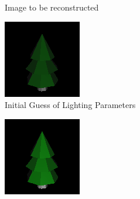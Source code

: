 \documentclass{juliacon}
\begin{document}
\begin{figure}[!htb]
\begin{subfigure}[b]{0.45\textwidth}
\begin{subfigure}[b]{0.4\textwidth}
            \caption{Image to be reconstructed}
            \label{fig:target_light}
        \end{subfigure}
        \hfill
        \begin{subfigure}[b]{0.4\textwidth}
            \centering
            \includegraphics[width=\textwidth]{images/light/initial.png}
            \caption{Initial Guess of Lighting Parameters}
            \label{fig:guess_light}
        \end{subfigure}
        \centering
        \hfill
        \begin{subfigure}[b]{0.4\textwidth}
            \centering
            \includegraphics[width=\textwidth]{images/light/161.png}

\end{subfigure}
\end{subfigure}
\end{figure}
\end{document}
